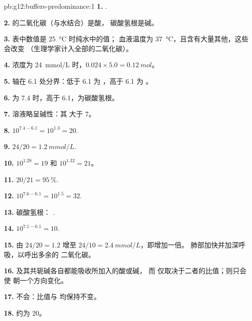 \begin{solution}{pb:g12:buffers-predominance:1}
\textbf{1.} .

\textbf{2.} 的二氧化碳（与水结合）是酸，
碳酸氢根是碱。

\textbf{3.} 表中数值是 \qty{25}{\celsius} 时纯水中的值；
血液温度为 \qty{37}{\celsius}，且含有大量其他，这些会改变
（生理学家计入全部的二氧化碳）。

\textbf{4.} 浓度为 \qty{24}{mmol/L} 时，$0.024 \times 5.0 = \qty{0.12}{mol}$。

\textbf{5.}  轴在 6.1 处分界：低于 6.1 为 ，高于 6.1 为 。

\textbf{6.}  为 7.4 时，高于 6.1，为碳酸氢根。

\textbf{7.} 溶液略呈碱性：其  大于 7。

\textbf{8.} $10^{7.4 - 6.1} = 10^{1.3} = 20$.

\textbf{9.} $24 / 20 = \qty{1.2}{mmol/L}$.

\textbf{10.} $10^{1.28} = 19$ 和 $10^{1.32} = 21$。

\textbf{11.} $20/21 = \qty{95}{\percent}$.

\textbf{12.} $10^{7.6 - 6.1} = 10^{1.5} = 32$.

\textbf{13.} 碳酸氢根：
.

\textbf{14.} $10^{7.1 - 6.1} = 10$.

\textbf{15.} 由 $24/20 = 1.2$ 增至 $24/10 = \qty{2.4}{mmol/L}$，即增加一倍。
肺部加快并加深呼吸，以呼出多余的
二氧化碳。

\textbf{16.} 及其共轭碱各自都能吸收所加入的酸或碱，
而  仅取决于二者的比值；则只会使
 朝一个方向变化。

\textbf{17.} 不会：比值与  均保持不变。

\textbf{18.} 约为 20。
\end{solution}
